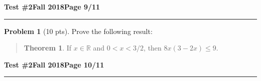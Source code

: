 \documentclass[11pt]{article}
\theoremstyle{definition}
\newtheorem{problem}{Problem}
\theoremstyle{theorem}
\newtheorem*{theorem}{Theorem}
\begin{document}
\hfill{\large\bf Test \#2}\hfill{\large\bf Fall 2018}\hfill{\large\bf Page 9/11}\hrule

\bigskip
\begin{problem}[10 pts]
  Prove the following result:
  \vspace{-0.75cm}
  \begin{quotation}
    \begin{theorem}
      If $x \in \mathbb{R}$ and $0 < x < 3/2$, then $8x(3-2x) \leq 9$.
    \end{theorem}
  \end{quotation}
\end{problem}
\newpage

\hfill{\large\bf Test \#2}\hfill{\large\bf Fall 2018}\hfill{\large\bf Page 10/11}\hrule
\end{document}

